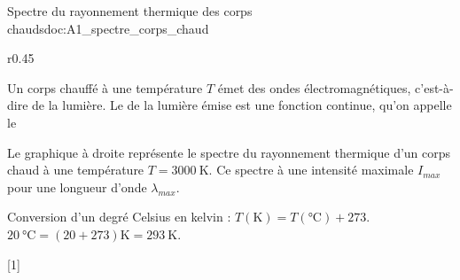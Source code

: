 

\newpage
\vspace*{-36pt}
\begin{doc}{Spectre du rayonnement thermique des corps chauds}{doc:A1_spectre_corps_chaud}
  \begin{wrapfigure}[5]{r}{0.45\linewidth}
    \vspace*{-20pt}
    \centering
  \end{wrapfigure}
  \strut\vspace*{-22pt}
  
  \begin{importants}  
    Un corps chauffé à une température $T$ émet des ondes électromagnétiques, c'est-à-dire de la lumière.
    Le  de la lumière émise est une fonction continue, qu'on appelle le 
  \end{importants}

  Le graphique à droite représente le spectre du rayonnement thermique d'un corps chaud à une température $T = \qty{3000}{\kelvin}$.
  Ce spectre à une intensité maximale $I_{max}$ pour une longueur d'onde $\lambda_{max}$.
  \medskip

  \begin{importants}
    Conversion d'un degré Celsius en kelvin :
    $T(\unit{\kelvin}) = T(\unit{\degreeCelsius}) + 273$. 
    \exemple $\qty{20}{\degreeCelsius} = (20 + 273) \unit{\kelvin} = \qty{293}{\kelvin}$.
  \end{importants}
\end{doc}

[1]


